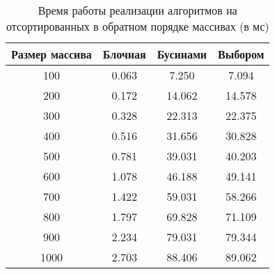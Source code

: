 \begin{table}[H]
	\begin{center}
		\begin{threeparttable}
			\captionsetup{justification=raggedright,singlelinecheck=off}
			\caption{Время работы реализации алгоритмов на отсортированных в обратном порядке массивах (в мс)}
			\label{tbl:time_measurements_sorted}
			\begin{tabular}{|c|c|c|c|}
				\hline
				Размер массива & Блочная & Бусинами & Выбором \\
				\hline
				100 & 0.063 & 7.250 & 7.094 \\
				\hline
				200 & 0.172 & 14.062 & 14.578 \\
				\hline
				300 & 0.328 & 22.313 & 22.375 \\
				\hline
				400 & 0.516 & 31.656 & 30.828 \\
				\hline
				500 & 0.781 & 39.031 & 40.203 \\
				\hline
				600 & 1.078 & 46.188 & 49.141 \\
				\hline
				700 & 1.422 & 59.031 & 58.266 \\
				\hline
				800 & 1.797 & 69.828 & 71.109 \\
				\hline
				900 & 2.234 & 79.031 & 79.344 \\
				\hline
				1000 & 2.703 & 88.406 & 89.062 \\
				\hline
			\end{tabular}
		\end{threeparttable}
	\end{center}
\end{table}

